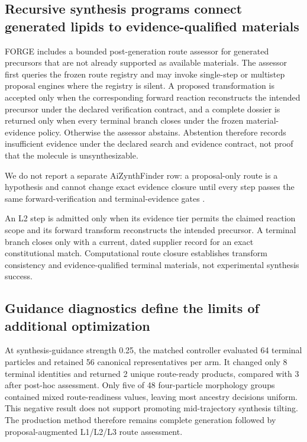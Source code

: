 \documentclass{article}
\newcommand{\ForgeSynthesisCanonicalRepresentatives}{56}
\newcommand{\ForgeSynthesisChangedIdentities}{8}
\newcommand{\ForgeSynthesisGuidanceStrength}{0.25}
\newcommand{\ForgeSynthesisGuidedReady}{2}
\newcommand{\ForgeSynthesisPosthocReady}{3}
\newcommand{\ForgeSynthesisTerminalParticles}{64}
\begin{document}
\subsection{Recursive synthesis programs connect generated lipids to evidence-qualified materials}

FORGE includes a bounded post-generation route assessor for generated precursors that are not
already supported as available materials. The assessor first queries the frozen route registry and
may invoke single-step or multistep proposal engines where the registry is silent. A proposed
transformation is accepted only when the corresponding forward reaction reconstructs the intended
precursor under the declared verification contract, and a complete dossier is returned only when
every terminal branch closes under the frozen material-evidence policy. Otherwise the assessor
abstains. Abstention therefore records insufficient evidence under the declared search and evidence
contract, not proof that the molecule is unsynthesizable.

We do not report a separate AiZynthFinder row: a proposal-only route is a hypothesis and cannot
change exact evidence closure until every step passes the same forward-verification and
terminal-evidence gates \citep{genheden2020aizynthfinder}.

An L2 step is admitted only when its evidence tier permits the claimed reaction scope and its
forward transform reconstructs the intended precursor. A terminal branch closes only with a current,
dated supplier record for an exact constitutional match. Computational route closure establishes
transform consistency and evidence-qualified terminal materials, not experimental synthesis
success.

\subsection{Guidance diagnostics define the limits of additional optimization}

At synthesis-guidance strength \ForgeSynthesisGuidanceStrength{}, the matched controller evaluated
\ForgeSynthesisTerminalParticles{} terminal particles and retained
\ForgeSynthesisCanonicalRepresentatives{} canonical representatives per arm. It changed only
\ForgeSynthesisChangedIdentities{} terminal identities and returned
\ForgeSynthesisGuidedReady{} unique route-ready products, compared with
\ForgeSynthesisPosthocReady{} after post-hoc assessment. Only five of 48 four-particle morphology
groups contained mixed route-readiness values, leaving most ancestry decisions uniform. This
negative result does not support promoting mid-trajectory synthesis tilting. The production method
therefore remains complete generation followed by proposal-augmented L1/L2/L3 route assessment.
\end{document}
